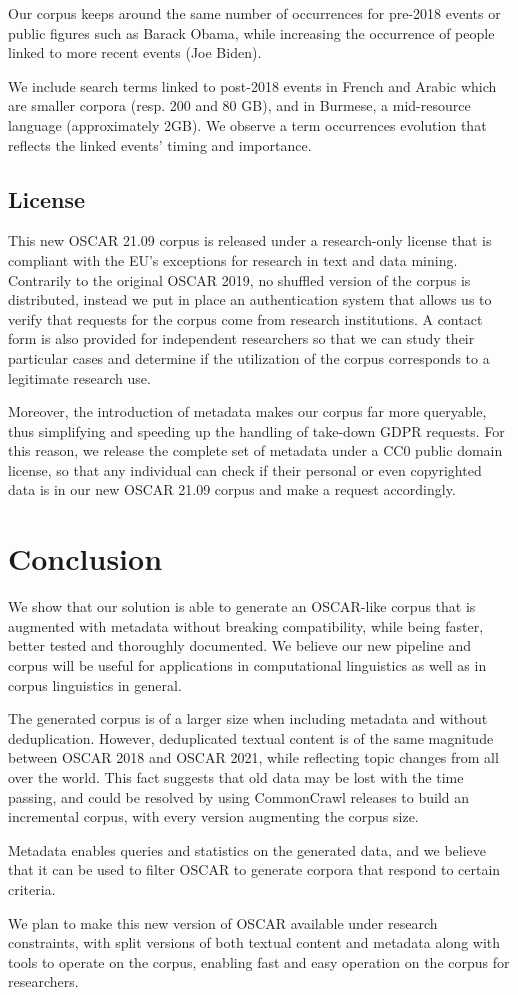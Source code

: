 Our corpus keeps around the same number of occurrences for pre-2018 events or public figures such as Barack Obama, while increasing the occurrence of people linked to more recent events (Joe Biden).

We include search terms linked to post-2018 events in French and Arabic which are smaller corpora (resp. 200 and 80 GB), and in Burmese, a mid-resource language (approximately 2GB). We observe a term occurrences evolution that reflects the linked events' timing and importance.

\subsection{License}

This new OSCAR 21.09 corpus is released under a research-only license that is compliant with the EU's exceptions for research in text and data mining. Contrarily to the original OSCAR 2019, no shuffled version of the corpus is distributed, instead we put in place an authentication system that allows us to verify that requests for the corpus come from research institutions. A contact form is also provided for independent researchers so that we can study their particular cases and determine if the utilization of the corpus corresponds to a legitimate research use.

Moreover, the introduction of metadata makes our corpus far more queryable, thus simplifying and speeding up the handling of take-down GDPR requests. For this reason, we release the complete set of metadata under a CC0 public domain license, so that any individual can check if their personal or even copyrighted data is in our new OSCAR 21.09 corpus and make a request accordingly.

\section{Conclusion}

We show that our solution is able to generate an OSCAR-like corpus that is augmented with metadata without breaking compatibility, while being faster, better tested and thoroughly documented. We believe our new pipeline and corpus will be useful for applications in computational linguistics as well as in corpus linguistics in general.

The generated corpus is of a larger size when including metadata and without deduplication. However, deduplicated textual content is of the same magnitude between OSCAR 2018 and OSCAR 2021, while reflecting topic changes from all over the world. This fact suggests that old data may be lost with the time passing, and could be resolved by using CommonCrawl releases to build an incremental corpus, with every version augmenting the corpus size.

Metadata enables queries and statistics on the generated data, and we believe that it can be used to filter OSCAR to generate corpora that respond to certain criteria.

We plan to make this new version of OSCAR available under research constraints, with split versions of both textual content and metadata along with tools to operate on the corpus, enabling fast and easy operation on the corpus for researchers.